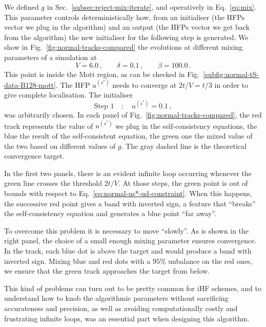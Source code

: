 We defined $g$ in Sec.~\ref{subsec:reject-mix-iterate}, and operatively in Eq.~\eqref{eq:mix}. This parameter controls deterministically how, from an initialiser (the HFPs vector we plug in the algorithm) and an output (the HFPs vector we get back from the algorithm) the new initialiser for the following step is generated. We show in Fig.~\ref{fig:normal-tracks-compared} the evolutions at different mixing parameters of a simulation at
\[
	V = 6.0 \, ,
	\qquad
	\delta = 0.1 \, ,
	\qquad
	\beta = 100.0 \, .
\]
This point is inside the Mott region, as can be checked in Fig.~\ref{subfig:normal-tS-data-B128-mott}. The HFP $u^{(s^*)}$ needs to converge at $2t/V=t/3$ in order to give complete localisation. The initialiser
\[
	\text{Step $1$}
	\quad\colon\quad
	u^{(s^*)} = 0.1 \, ,
\]
was arbitrarily chosen. In each panel of Fig.~\ref{fig:normal-tracks-compared}, the red track represents the value of $u^{(s^*)}$ we plug in the self-consistency equations, the blue the result of the self-consistent equation, the green one the mixed value of the two based on different values of $g$. The gray dashed line is the theoretical convergence target. 

In the first two panels, there is an evident infinite loop occurring whenever the green line crosses the threshold $2t/V$. At those steps, the green point is out of bounds with respect to Eq.~\eqref{eq:normal-us*-ud-constraint}. When this happens, the successive red point gives a band with inverted sign, a feature that ``breaks'' the self-consistency equation and generates a blue point ``far away''.

To overcome this problem it is necessary to move ``slowly''. As is shown in the right panel, the choice of a small enough mixing parameter ensures convergence. In the track, each blue dot is above the target and would produce a band with inverted sign. Mixing blue and red dots with a $95\%$ unbalance on the red ones, we ensure that the green track approaches the target from below.

This kind of problems can turn out to be pretty common for iHF schemes, and to understand how to knob the algorithmic parameters without sacrificing accurateness and precision, as well as avoiding computationally costly and frustrating infinite loops, was an essential part when designing this algorithm.